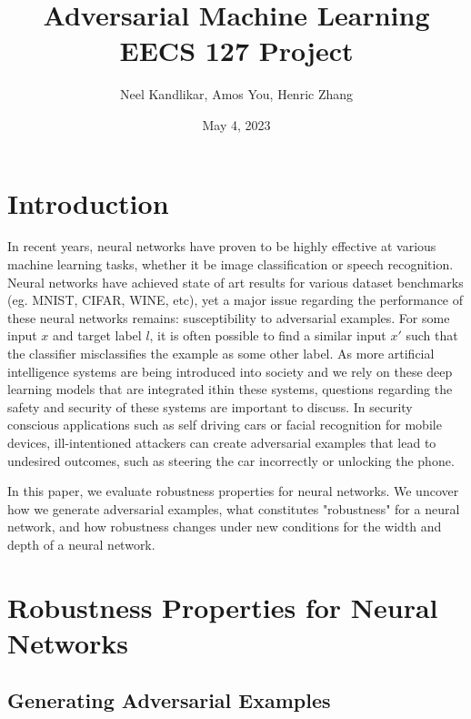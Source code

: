 \documentclass{article}
\title{\vspace{5cm} 
    \textbf{Adversarial Machine Learning} \\
    \vspace{0.25cm}
    \Large{EECS 127 Project}
}  %
\author{Neel Kandlikar, Amos You, Henric Zhang}
\date{May 4, 2023}
\begin{document}
\maketitle

\pagebreak

{
  \hypersetup{linkcolor=black}
  \tableofcontents
}

\pagebreak

\section{Introduction}

In recent years, neural networks have proven to be highly effective at various machine learning tasks,
whether it be image classification or speech recognition. Neural networks have achieved state of 
art results for various dataset benchmarks (eg. MNIST, CIFAR, WINE, etc), yet a major issue regarding
the performance of these neural networks remains: susceptibility to adversarial examples. For some 
input $x$ and target label $l$, it is often possible to find a similar input $x'$ such that the 
classifier misclassifies the example as some other label. As more artificial intelligence systems
are being introduced into society and we rely on these deep learning models that are integrated 
ithin these systems, questions regarding the safety and security of these systems are important to
discuss. In security conscious applications such as self driving cars or facial recognition for
mobile devices, ill-intentioned attackers can create adversarial examples that lead to undesired
outcomes, such as steering the car incorrectly or unlocking the phone.

In this paper, we evaluate robustness properties for neural networks. We uncover how we generate 
adversarial examples, what constitutes "robustness" for a neural network, and how robustness 
changes under new conditions for the width and depth of a neural network.

\section{Robustness Properties for Neural Networks}

\subsection{Generating Adversarial Examples}
\end{document}
